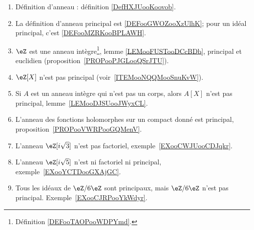 	    \label{THEMEooVIQIooOcFAQS}
\begin{enumerate}
	\item
	      Définition d'anneau : définition \ref{DefHXJUooKoovob}.
	\item
	      La définition d'anneau principal est \ref{DEFooGWOZooXzUlhK}; pour un idéal principal, c'est \ref{DEFooMZRKooBPLAWH}.
	\item
	      \( \eZ\) est une anneau intègre\footnote{Définition \ref{DEFooTAOPooWDPYmd}.}, lemme \ref{LEMooFUSTooDCcBDb}, principal et euclidien (proposition~\ref{PROPooPJGLooQSrJTU}).
	\item
	      \( \eZ[X]\) n'est pas principal (voir~\ref{ITEMooNQQMooSnuKvW}).
	\item   \label{ITEMooNQQMooSnuKvW}
	      Si \( A\) est un anneau intègre qui n'est pas un corps, alors \( A[X]\) n'est pas principal, lemme~\ref{LEMooDJSUooJWyxCL}.
	\item
	      L'anneau des fonctions holomorphes sur un compact donné est principal, proposition~\ref{PROPooVWRPooGQMenV}.
	\item
	      L'anneau \( \eZ[i\sqrt{ 3 }]\) n'est pas factoriel, exemple~\ref{EXooCWJUooCDJqkr}.
	\item
	      L'anneau \( \eZ[i\sqrt{ 5 }]\) n'est ni factoriel ni principal, exemple~\ref{EXooYCTDooGXAjGC}.
	\item
	      Tous les idéaux de \( \eZ/6\eZ\) sont principaux, mais \( \eZ/6\eZ\) n'est pas principal. Exemple~\ref{EXooCJRPooYkWdyr}.
\end{enumerate}

